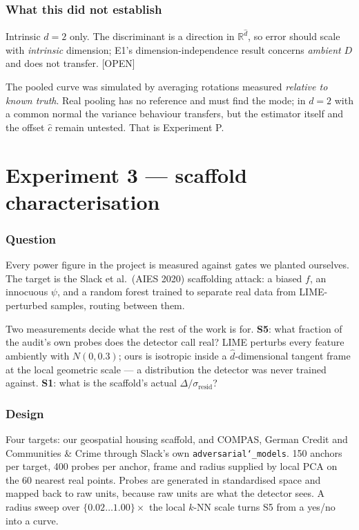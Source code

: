 \documentclass[11pt]{article}
\newcommand{\R}{\mathbb{R}}
\newcommand{\chat}{\hat{c}}
\newcommand{\provtag}[2]{{\footnotesize\sffamily\textcolor{#1}{[#2]}}}
\newcommand{\OPENT}{\provtag{openamber}{OPEN}}
\begin{document}
\section{What this did not establish}

Intrinsic $d = 2$ only. The discriminant is a direction in $\R^{\hat d}$, so error should scale
with \emph{intrinsic} dimension; E1's dimension-independence result concerns \emph{ambient} $D$
and does not transfer. \OPENT

The pooled curve was simulated by averaging rotations measured \emph{relative to known truth}.
Real pooling has no reference and must find the mode; in $d=2$ with a common normal the variance
behaviour transfers, but the estimator itself and the offset $\chat$ remain untested. That is
Experiment P.

\part{Experiment 3 --- scaffold characterisation}

\section{Question}

Every power figure in the project is measured against gates we planted ourselves. The target is
the Slack et al.\ (AIES 2020) scaffolding attack: a biased $f$, an innocuous $\psi$, and a random
forest trained to separate real data from LIME-perturbed samples, routing between them.

Two measurements decide what the rest of the work is for. \textbf{S5}: what fraction of the
audit's own probes does the detector call real? LIME perturbs every feature ambiently with
$N(0,0.3)$; ours is isotropic inside a $\hat d$-dimensional tangent frame at the local geometric
scale --- a distribution the detector was never trained against. \textbf{S1}: what is the
scaffold's actual $\Delta/\sigma_{\text{resid}}$?

\section{Design}

Four targets: our geospatial housing scaffold, and COMPAS, German Credit and Communities \&
Crime through Slack's own \texttt{adversarial\char`_models}. 150 anchors per target, 400 probes
per anchor, frame and radius supplied by local PCA on the 60 nearest real points. Probes are
generated in standardised space and mapped back to raw units, because raw units are what the
detector sees. A radius sweep over $\{0.02 \dots 1.00\}\times$ the local $k$-NN scale turns S5
from a yes/no into a curve.
\end{document}
